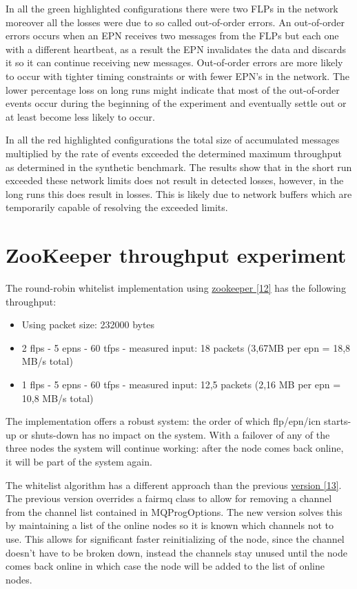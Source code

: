\documentclass[]{article}
\begin{document}
In all the green highlighted configurations there were two FLPs in the network moreover all the losses were due to so called out-of-order errors. An out-of-order errors occurs when an EPN receives two messages from the FLPs but each one with a different heartbeat, as a result the EPN invalidates the data and discards it so it can continue receiving new messages. Out-of-order errors are more likely to occur with tighter timing constraints or with fewer EPN’s in the network. The lower percentage loss on long runs might indicate that most of the out-of-order events occur during the beginning of the experiment and eventually settle out or at least become less likely to occur.

In all the red highlighted configurations the total size of accumulated messages multiplied by the rate of events exceeded the determined maximum throughput as determined in the synthetic benchmark. The results show that in the short run exceeded these network limits does not result in detected losses, however, in the long runs this does result in losses. This is likely due to network buffers which are temporarily capable of resolving the exceeded limits.


\section{ZooKeeper throughput experiment}
The round-robin whitelist implementation using \hyperref[sec:ref12]{zookeeper [12]} has the following throughput:
\begin{itemize}
	\itemsep 0em
	\item Using packet size: 232000 bytes
	\item 2 flps - 5 epns - 60 tfps - measured input: 18 packets (3,67MB per epn = 18,8 MB/s total)
	\item 1 flps - 5 epns - 60 tfps - measured input: 12,5 packets (2,16 MB per epn = 10,8 MB/s total)
\end{itemize}

The implementation offers a robust system: the order of which flp/epn/icn starts-up or shuts-down has no impact on the system. With a failover of any of the three nodes the system will continue working: after the node comes back online, it will be part of the system again.

The whitelist algorithm has a different approach than the previous \hyperref[sec:ref13]{version [13]}. The previous version overrides a fairmq class to allow for removing a channel from the channel list contained in MQProgOptions.  The new version solves this by maintaining a list of the online nodes so it is known which channels not to use. This allows for significant faster reinitializing of the node, since the channel doesn’t have to be broken down, instead the channels stay unused until the node comes back online in which case the node will be added to the list of online nodes. 
\end{document}
